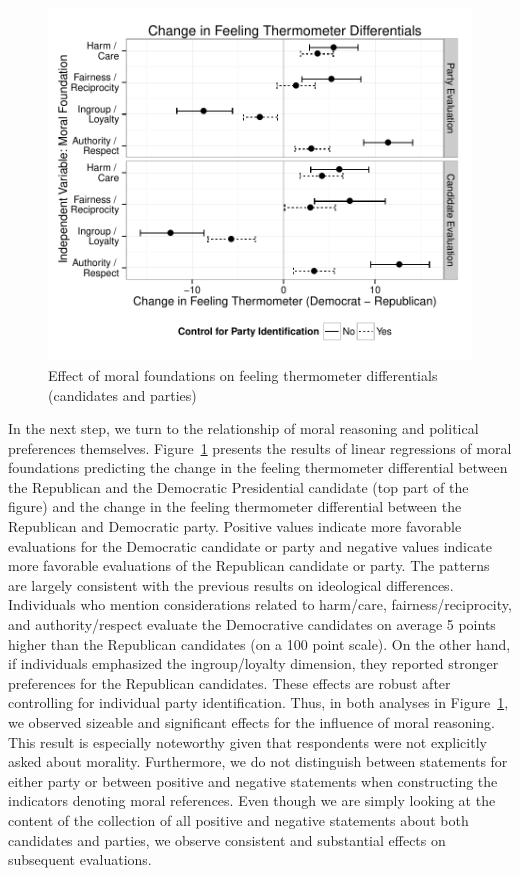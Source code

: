 \documentclass[12pt]{article}
\begin{document}
\begin{figure}[ht]\centering
\includegraphics{../calc/fig/fig7feel.pdf}
\caption{Effect of moral foundations on feeling thermometer differentials (candidates and parties)}\label{fig:7feel}
\end{figure}

In the next step, we turn to the relationship of moral reasoning and political preferences themselves. Figure~\ref{fig:7feel} presents the results of linear regressions of moral foundations predicting the change in the feeling thermometer differential between the Republican and the Democratic Presidential candidate (top part of the figure) and the change in the feeling thermometer differential between the Republican and Democratic party. Positive values indicate more favorable evaluations for the Democratic candidate or party and negative values indicate more favorable evaluations of the Republican candidate or party. The patterns are largely consistent with the previous results on ideological differences. Individuals who mention considerations related to harm/care, fairness/reciprocity, and authority/respect evaluate the Democrative candidates on average 5 points higher than the Republican candidates (on a 100 point scale). On the other hand, if individuals emphasized the ingroup/loyalty dimension, they reported stronger preferences for the Republican candidates. These effects are robust after controlling for individual party identification. Thus, in both analyses in Figure~\ref{fig:7feel}, we observed sizeable and significant effects for the influence of moral reasoning. This result is especially noteworthy given that respondents were not explicitly asked about morality. Furthermore, we do not distinguish between statements for either party or between positive and negative statements when constructing the indicators denoting moral references. Even though we are simply looking at the content of the collection of all positive and negative statements about both candidates and parties, we observe consistent and substantial effects on subsequent evaluations.
\end{document}
